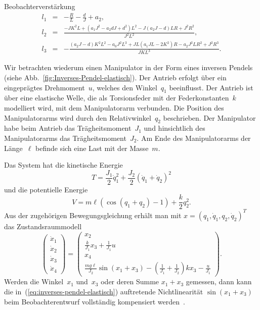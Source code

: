 \begin{example}
Beobachterverstärkung 
\begin{equation}
\begin{array}{lcl}
l_{1} & = & -\frac{R}{L}-\frac{d}{J}+a_{2},\\
l_{2} & = & \frac{-JK^{2}L+\left(a_{1}J^{2}-a_{2}dJ+d^{2}\right)L^{2}-J\left(a_{2}J-d\right)LR+J^{2}R^{2}}{J^{2}L^{2}},\\
l_{3} & = & -\frac{\left(a_{2}J-d\right)K^{2}L^{2}-a_{0}J^{2}L^{3}+JL\left(a_{1}JL-2K^{2}\right)R-a_{2}J^{2}LR^{2}+J^{2}R^{3}}{JKL^{3}}.
\end{array}\label{eq:inverses-pendel-motor-nf-verstaerkung}
\end{equation}
\end{example}

\begin{example}
\label{exa:inverses-pendel-elastisch}Wir betrachten wiederum einen
Manipulator in der Form eines inversen Pendels (siehe Abb.~\ref{fig:Inverses-Pendel-elastisch}).
Der Antrieb erfolgt über ein eingeprägtes Drehmoment~$u$, welches
den Winkel~$q_{1}$ beeinflusst. Der Antrieb ist über eine elastische
Welle, die als Torsionsfeder mit der Federkonstanten~$k$ modelliert
wird, mit dem Manipulatorarm verbunden. Die Position des Manipulatorarms
wird durch den Relativwinkel~$q_{2}$ beschrieben. Der Manipulator
habe beim Antrieb das Trägheitsmoment~$J_{1}$ und hinsichtlich des
Manipulatorarms das Trägheitsmoment~$J_{2}$. Am Ende des Manipulatorarms
der Länge~$\ell$ befinde sich eine Last mit der Masse~$m$.

Das System hat die kinetische Energie
\[
T=\frac{J_{1}}{2}\dot{q}_{1}^{2}+\frac{J_{2}}{2}\left(\dot{q}_{1}+\dot{q}_{2}\right)^{2}
\]
und die potentielle Energie
\[
V=m\ell\left(\cos(q_{1}+q_{2})-1\right)+\frac{k}{2}q_{2}^{2}.
\]
Aus der zugehörigen Bewegungsgleichung erhält man mit $x=(q_{1},\dot{q}_{1},q_{2},\dot{q}_{2})^{T}$
das Zustandsraummodell
\begin{equation}
\left(\begin{array}{l}
\dot{x}_{1}\\
\dot{x}_{2}\\
\dot{x}_{3}\\
\dot{x}_{4}
\end{array}\right)=\left(\begin{array}{c}
x_{2}\\
\frac{k}{J_{1}}x_{3}+\frac{1}{J_{1}}u\\
x_{4}\\
\frac{mg\ell}{J_{2}}\sin(x_{1}+x_{3})-\left(\frac{1}{J_{1}}+\frac{1}{J_{2}}\right)kx_{3}-\frac{u}{J_{1}}
\end{array}\right).\label{eq:inverses-pendel-elastisch}
\end{equation}
Werden die Winkel~$x_{1}$ und~$x_{3}$ oder deren Summe $x_{1}+x_{3}$
gemessen, dann kann die in~(\ref{eq:inverses-pendel-elastisch})
auftretende Nichtlinearität $\sin(x_{1}+x_{3})$ beim Beobachterentwurf
vollständig kompensiert werden~\cite{nicosia88}.
\end{example}
